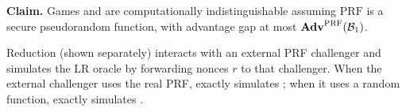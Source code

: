 \textbf{Claim.}
  Games  and  are computationally indistinguishable assuming $\mathrm{PRF}$
  is a secure pseudorandom function, with advantage gap at most
  $\mathbf{Adv}^{\mathrm{PRF}}(\mathcal{B}_1)$.

Reduction  (shown separately) interacts with an external PRF challenger
and simulates the LR oracle by forwarding nonces $r$ to that challenger.
When the external challenger uses the real PRF,  exactly simulates
; when it uses a random function,  exactly simulates .
